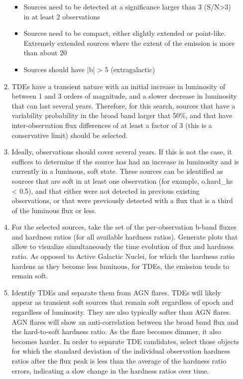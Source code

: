 \begin{enumerate}
\begin{enumerate}
    \begin{itemize}
    \item Sources need to be detected at a significance larger than 3 (S/N>3) in at least 2 observations
    \item Sources need to be compact, either slightly extended or point-like. Extremely extended sources where the extent of the emission is more than about 20%
    \item Sources should have |b| > 5 (extragalactic)
    \end{itemize}
  \item TDEs have a transient nature with an initial increase in luminosity of between 1 and 3 orders of magnitude, and a slower decrease in luminosity that can last several years. Therefore, for this search, sources that have a variability probability in the broad band larger that 50\%, and that have inter-observation flux differences of at least a factor of 3 (this is a conservative limit) should be selected.
  \item Ideally, observations should cover several years. If this is not the case, it suffices to determine if the source has had an increase in luminosity and is currently in a luminous, soft state. These sources can be identified as sources that are soft in at least one observation (for example, o.hard\_hs < 0.5), and that either were not detected in previous existing observations, or that were previously detected with a flux that is a third of the luminous flux or less.
  \item For the selected sources, take the set of the per-observation b-band fluxes and hardness ratios (for all available hardness ratios). Generate plots that allow to visualize simultaneously the time evolution of flux and hardness ratio. As opposed to Active Galactic Nuclei, for which the hardness ratio hardens as they become less luminous, for TDEs, the emission tends to remain soft. 
  \item Identify TDEs and separate them from AGN flares. TDEs will likely appear as transient soft sources that remain soft regardless of epoch and regardless of luminosity. They are also typically softer than AGN flares. AGN flares will show an anti-correlation between the broad band flux and the hard-to-soft hardness ratio. As the flare becomes dimmer, it also becomes harder. In order to separate TDE candidates, select those objects for which the standard deviation of the individual observation hardness ratios after the flux peak is less than the average of the hardness ratio errors, indicating a slow change in the hardness ratios over time. 

\end{enumerate}
\end{enumerate}
